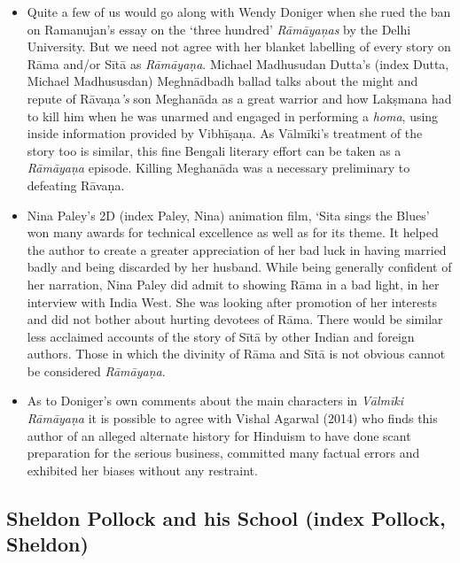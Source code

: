 \begin{itemize}
\item Quite a few of us would go along with Wendy Doniger when she rued the ban on Ramanujan’s essay on the ‘three hundred’ \textit{Rāmāyaņas} by the Delhi University. But we need not agree with her blanket labelling of every story on Rāma and/or Sītā as \textit{Rāmāyaṇa}. Michael Madhusudan Dutta’s (index Dutta, Michael Madhususdan) Meghnādbadh ballad talks about the might and repute of Rāvaṇa\textit{'s} son Meghanāda as a great warrior and how Lakṣmana had to kill him when he was unarmed and engaged in performing a \textit{homa}, using inside information provided by Vibhīṣaṇa. As Vālmīki’s treatment of the story too is similar, this fine Bengali literary effort can be taken as a \textit{Rāmāyaṇa} episode. Killing Meghanāda was a necessary preliminary to defeating Rāvaṇa.

 \item Nina Paley’s 2D (index Paley, Nina) animation film, ‘Sita sings the Blues’ won many awards for technical excellence as well as for its theme. It helped the author to create a greater appreciation of her bad luck in having married badly and being discarded by her husband. While being generally confident of her narration, Nina Paley did admit to showing Rāma in a bad light, in her interview with India West. She was looking after promotion of her interests and did not bother about hurting devotees of Rāma. There would be similar less acclaimed accounts of the story of Sītā by other Indian and foreign authors. Those in which the divinity of Rāma and Sītā is not obvious cannot be considered \textit{Rāmāyaṇa}.

 \item As to Doniger’s own comments about the main characters in \textit{Vālmīki Rāmāyaṇa} it is possible to agree with Vishal Agarwal (2014) who finds this author of an alleged alternate history for Hinduism to have done scant preparation for the serious business, committed many factual errors and exhibited her biases without any restraint.

\end{itemize}


\subsection*{Sheldon Pollock and his School (index Pollock, Sheldon)}


